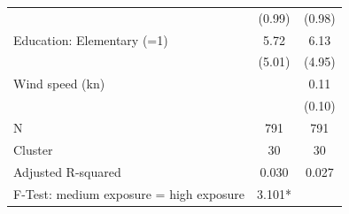 {\begin{tabular}{l*{2}{c}}
                    &      (0.99)         &      (0.98)         \\
Education: Elementary (=1)&        5.72         &        6.13         \\
                    &      (5.01)         &      (4.95)         \\
Wind speed (kn)     &                     &        0.11         \\
                    &                     &      (0.10)         \\
\midrule
N                   &         791         &         791         \\
Cluster             &          30         &          30         \\
Adjusted R-squared  &       0.030         &       0.027         \\
F-Test: medium exposure = high exposure&      3.101*         &                     \\
\bottomrule
\end{tabular}
}
